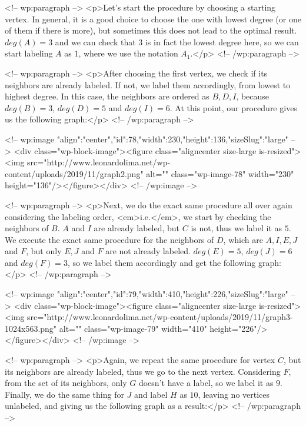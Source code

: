 <!-- wp:paragraph -->
<p>Let's start the procedure by choosing a starting vertex. In general, it is a good choice to choose the one with lowest degree (or one of them if there is more), but sometimes this does not lead to the optimal result. $deg(A) = 3$ and we can check that $3$ is in fact the lowest degree here, so we can start labeling $A$ as $1$, where we use the notation $A_1$.</p>
<!-- /wp:paragraph -->

<!-- wp:paragraph -->
<p>After choosing the first vertex, we check if its neighbors are already labeled. If not, we label them accordingly, from lowest to highest degree. In this case, the neighbors are ordered as $B, D, I$, because $deg(B) = 3$, $deg(D) = 5$ and $deg(I) = 6$. At this point, our procedure gives us the following graph:</p>
<!-- /wp:paragraph -->

<!-- wp:image {"align":"center","id":78,"width":230,"height":136,"sizeSlug":"large"} -->
<div class="wp-block-image"><figure class="aligncenter size-large is-resized"><img src="http://www.leonardolima.net/wp-content/uploads/2019/11/graph2.png" alt="" class="wp-image-78" width="230" height="136"/></figure></div>
<!-- /wp:image -->

<!-- wp:paragraph -->
<p>Next, we do the exact same procedure all over again considering the labeling order, <em>i.e.</em>, we start by checking the neighbors of $B$. $A$ and $I$ are already labeled, but $C$ is not, thus we label it as $5$. We execute the exact same procedure for the neighbors of $D$, which are $A, I, E, J$ and $F$, but only $E, J$ and $F$ are not already labeled. $deg(E) = 5$, $deg(J) = 6$ and $deg(F) = 3$, so we label them accordingly and get the following graph:</p>
<!-- /wp:paragraph -->

<!-- wp:image {"align":"center","id":79,"width":410,"height":226,"sizeSlug":"large"} -->
<div class="wp-block-image"><figure class="aligncenter size-large is-resized"><img src="http://www.leonardolima.net/wp-content/uploads/2019/11/graph3-1024x563.png" alt="" class="wp-image-79" width="410" height="226"/></figure></div>
<!-- /wp:image -->

<!-- wp:paragraph -->
<p>Again, we repeat the same procedure for vertex $C$, but its neighbors are already labeled, thus we go to the next vertex. Considering $F$, from the set of its neighbors, only $G$ doesn't have a label, so we label it as $9$. Finally, we do the same thing for $J$ and label $H$ as $10$, leaving no vertices unlabeled, and giving us the following graph as a result:</p>
<!-- /wp:paragraph -->

